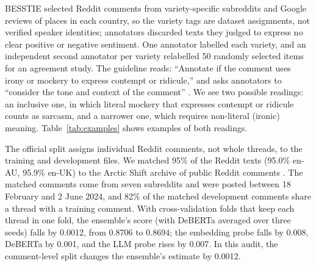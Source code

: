 \documentclass[11pt]{article}
\begin{document}
BESSTIE selected Reddit comments from variety-specific subreddits and Google reviews of places in each country, so the
variety tags are dataset assignments, not verified speaker identities; annotators discarded texts they judged to
express no clear positive or negative sentiment. One annotator labelled each variety, and an independent second annotator per
variety relabelled 50 randomly selected items for an agreement study. The guideline reads: ``Annotate if the comment uses irony or mockery to express
contempt or ridicule,'' and asks annotators to ``consider the tone and context of the comment''
\citep{srirag-etal-2025-besstie}. We see two possible readings: an inclusive one, in which literal mockery that expresses
contempt or ridicule counts as sarcasm, and a narrower one, which requires non-literal (ironic) meaning.
Table~\ref{tab:examples} shows examples of both readings.

The official split assigns individual Reddit comments, not whole threads, to the training and development files. We
matched 95\% of the Reddit texts (95.0\% en-AU, 95.9\% en-UK) to the Arctic Shift archive of public Reddit comments
\citep{arcticshift}. The matched comments come from seven subreddits and were posted between 18 February and 2 June
2024, and 82\% of the matched development comments share a thread with a training comment. With cross-validation folds
that keep each thread in one fold, the ensemble's score (with DeBERTa averaged over three seeds) falls by 0.0012, from
0.8706 to 0.8694; the embedding probe falls by 0.008, DeBERTa by 0.001, and the LLM probe rises by 0.007. In this
audit, the comment-level split changes the ensemble's estimate by 0.0012.
\end{document}
